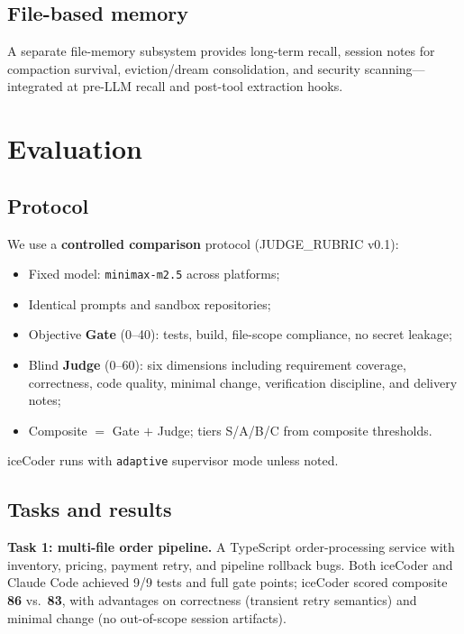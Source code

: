 \documentclass[11pt,a4paper]{article}
\begin{document}
\subsection{File-based memory}

A separate file-memory subsystem provides long-term recall, session notes for compaction survival, eviction/dream consolidation, and security scanning---integrated at pre-LLM recall and post-tool extraction hooks.

\section{Evaluation}
\label{sec:eval}

\subsection{Protocol}

We use a \textbf{controlled comparison} protocol (JUDGE\_RUBRIC v0.1):
\begin{itemize}[nosep]
  \item Fixed model: \texttt{minimax-m2.5} across platforms;
  \item Identical prompts and sandbox repositories;
  \item Objective \textbf{Gate} (0--40): tests, build, file-scope compliance, no secret leakage;
  \item Blind \textbf{Judge} (0--60): six dimensions including requirement coverage, correctness, code quality, minimal change, verification discipline, and delivery notes;
  \item Composite $=$ Gate $+$ Judge; tiers S/A/B/C from composite thresholds.
\end{itemize}

iceCoder runs with \texttt{adaptive} supervisor mode unless noted.

\subsection{Tasks and results}

\textbf{Task 1: multi-file order pipeline.}
A TypeScript order-processing service with inventory, pricing, payment retry, and pipeline rollback bugs.
Both iceCoder and Claude Code achieved 9/9 tests and full gate points; iceCoder scored composite \textbf{86} vs.\ \textbf{83}, with advantages on correctness (transient retry semantics) and minimal change (no out-of-scope session artifacts).
\end{document}
